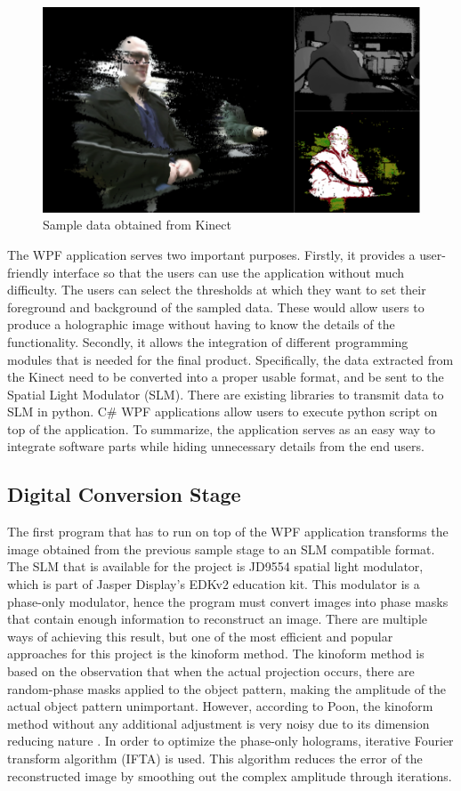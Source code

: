 \documentclass[12pt]{article}
\begin{document}
\begin{figure}
    \centering
    \includegraphics[width=\textwidth]{kinectsample}
    \caption{Sample data obtained from Kinect}
    \label{fig:kinect}
\end{figure}

The WPF application serves two important purposes. Firstly, it provides a user-friendly interface so that the users can use the application without much difficulty. The users can select the thresholds at which they want to set their foreground and background of the sampled data. These would allow users to produce a holographic image without having to know the details of the functionality. Secondly, it allows the integration of different programming modules that is needed for the final product. Specifically, the data extracted from the Kinect need to be converted into a proper usable format, and be sent to the Spatial Light Modulator (SLM). There are existing libraries to transmit data to SLM in python. C\# WPF applications allow users to execute python script on top of the application. To summarize, the application serves as an easy way to integrate software parts while hiding unnecessary details from the end users.

\subsection{Digital Conversion Stage}

The first program that has to run on top of the WPF application transforms the image obtained from the previous sample stage to an SLM compatible format. The SLM that is available for the project is JD9554 spatial light modulator, which is part of Jasper Display's EDKv2 education kit. This modulator is a phase-only modulator, hence the program must convert images into phase masks that contain enough information to reconstruct an image. There are multiple ways of achieving this result, but one of the most efficient and popular approaches for this project is the kinoform method. The kinoform method is based on the observation that when the actual projection occurs, there are random-phase masks applied to the object pattern, making the amplitude of the actual object pattern unimportant. However, according to Poon, the kinoform method without any additional adjustment is very noisy due to its dimension reducing nature \cite{Poon14}. In order to optimize the phase-only holograms, iterative Fourier transform algorithm (IFTA) is used. This algorithm reduces the error of the reconstructed image by smoothing out the complex amplitude through iterations.
\end{document}
